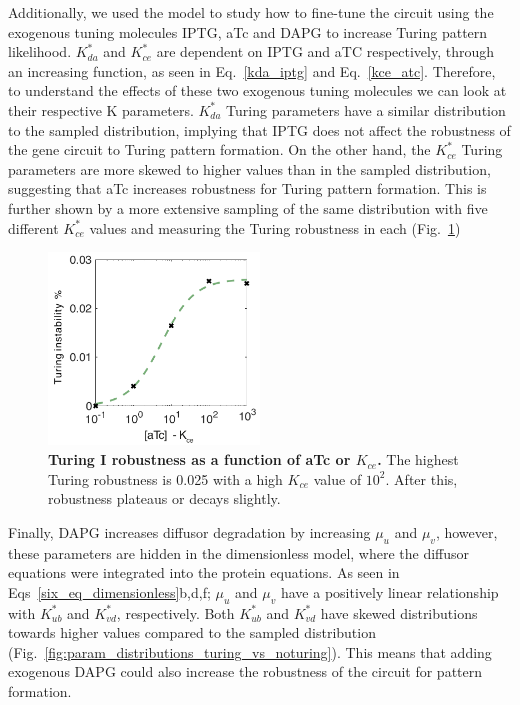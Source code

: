 Additionally, we used the model to study how to fine-tune the circuit using the exogenous tuning molecules IPTG, aTc and DAPG to increase Turing pattern likelihood.
$K_{da}^*$  and $K_{ce}^*$ are dependent on IPTG and aTC respectively, through an increasing function,
as seen in Eq.~\ref{kda_iptg} and Eq.~\ref{kce_atc}.
Therefore,
to understand the effects of these two exogenous tuning molecules we can look at their respective K parameters.
$K_{da}^*$ Turing parameters have a similar distribution to the sampled distribution,
implying that IPTG does not affect the robustness of the gene circuit to Turing pattern formation.
On the other hand, the $K_{ce}^*$ Turing parameters are more skewed to higher values than in the sampled distribution,
suggesting that aTc increases robustness for Turing pattern formation.
This is further shown by a more extensive sampling of the same distribution with five different $K_{ce}^*$ values
and measuring the Turing robustness in each
(Fig.~\ref{fig:atc_robustness})

\begin{figure}[H] %
    \centering
    \begin{adjustbox}{center}
        \includegraphics[width=0.5\textwidth]{chapters/Chapter 2/atc_robustness} %
    \end{adjustbox}
    \caption{\textbf{Turing I robustness as a function of aTc or $K_{ce}$.} The highest Turing robustness is 0.025 with a high $K_{ce}$ value of $10^2$. After this, robustness plateaus or decays slightly. }
    \label{fig:atc_robustness} %
\end{figure}

Finally, DAPG increases diffusor degradation by increasing $\mu_u$ and $\mu_v$,
however, these parameters are hidden in the dimensionless model,
where the diffusor equations were integrated into the protein equations.
As seen in Eqs~\ref{six_eq_dimensionless}b,d,f; $\mu_u$
and $\mu_v$ have a positively linear relationship with $K_{ub}^*$ and $K_{vd}^*$, respectively.
Both $K_{ub}^*$ and $K_{vd}^*$ have skewed distributions towards higher values compared to the sampled distribution
(Fig.~\ref{fig:param_distributions_turing_vs_noturing}).
This means that adding exogenous DAPG could also increase the robustness of the circuit for pattern formation.

